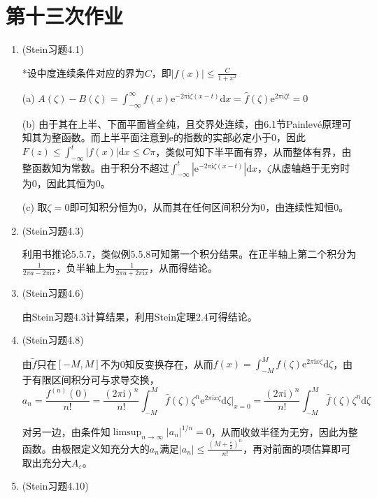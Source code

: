 \documentclass[a4paper,UTF8,fontset=windows]{ctexart}
\begin{document}
\section{第十三次作业}
\begin{enumerate}
    \item (Stein习题4.1)
    
    *设中度连续条件对应的界为$C$，即$|f(x)|\le\frac{C}{1+x^2}$
    
    (a) $A(\zeta)-B(\zeta)=\int_{-\infty}^\infty f(x)\mathrm{e}^{-2\pi\mathrm{i}\zeta(x-t)}\mathrm{d}x=\hat{f}(\zeta)\mathrm{e}^{2\pi\mathrm{i}\zeta t}=0$
    
    (b) 由于其在上半、下面平面皆全纯，且交界处连续，由6.1节Painlev\'e原理可知其为整函数。而上半平面注意到$\mathrm{e}$的指数的实部必定小于0，因此$F(z)\le\int_{-\infty}^t |f(x)|\mathrm{d}x\le C\pi$，类似可知下半平面有界，从而整体有界，由整函数知为常数。由于积分不超过$\int_{-\infty}^t|\mathrm{e}^{-2\pi\mathrm{i}\zeta(x-t)}|\mathrm{d}x$，$\zeta$从虚轴趋于无穷时为0，因此其恒为0。
    
    (c) 取$\zeta=0$即可知积分恒为0，从而其在任何区间积分为0，由连续性知恒0。
    
    \item (Stein习题4.3)
    
    利用书推论5.5.7，类似例5.5.8可知第一个积分结果。在正半轴上第二个积分为$\frac{1}{2\pi a-2\pi\mathrm{i}x}$，负半轴上为$\frac{1}{2\pi a+2\pi\mathrm{i}x}$，从而得结论。
    
    \item (Stein习题4.6)
    
    由Stein习题4.3计算结果，利用Stein定理2.4可得结论。
    
    \item (Stein习题4.8)
    
    由$\tilde{f}$只在$[-M,M]$不为0知反变换存在，从而$f(x)=\int_{-M}^M\hat{f}(\zeta)\mathrm{e}^{2\pi\mathrm{i}x\zeta}\mathrm{d}\zeta$，由于有限区间积分可与求导交换，
    \[a_n=\frac{f^{(n)}(0)}{n!}=\frac{(2\pi\mathrm{i})^n}{n!}\int_{-M}^M\hat{f}(\zeta)\zeta^n\mathrm{e}^{2\pi\mathrm{i}x\zeta}\mathrm{d}\zeta\big|_{x=0}=\frac{(2\pi\mathrm{i})^n}{n!}\int_{-M}^M\hat{f}(\zeta)\zeta^n\mathrm{d}\zeta\]
    
    对另一边，由条件知$\limsup_{n\to\infty}|a_n|^{1/n}=0$，从而收敛半径为无穷，因此为整函数。由极限定义知充分大的$a_n$满足$|a_n|\le\frac{(M+\frac{\varepsilon}{2})^n}{n!}$，再对前面的项估算即可取出充分大$A_\varepsilon$。
    
    \item (Stein习题4.10)
    

\end{enumerate}
\end{document}
